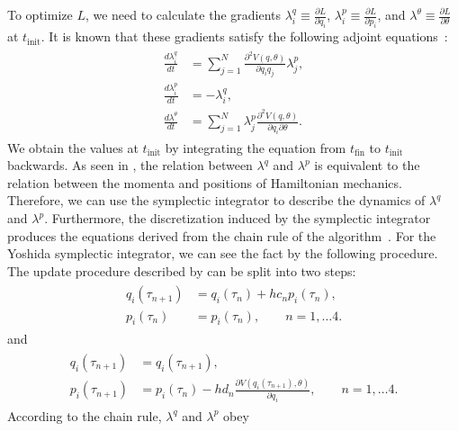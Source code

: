 To optimize $L$, we need to calculate the gradients $\lambda_i^q \equiv \frac{\partial L}{\partial q_i}$, $\lambda_i^p \equiv \frac{\partial L}{\partial p_i}$, and $\lambda^\theta \equiv \frac{\partial L}{\partial \theta}$ at $t_{\mathrm{init}}$.
It is known that these gradients satisfy the following adjoint equations~\cite{NeuralODE,Sanz-Serna2016}:
\begin{align}
  \begin{split}
    \frac{d\lambda^{q}_i}{dt} & = \sum_{j=1}^{N}\frac{\partial^2 V(q,\theta)}{\partial q_i q_j} \lambda^{p}_j, \\
    \frac{d\lambda^{p}_i}{dt} & = - \lambda^{q}_i,\\
    \frac{d\lambda^{\theta}}{dt} & =  \sum_{j=1}^{N}\lambda^{p}_j\frac{\partial^2V(q,\theta)}{\partial q_i \partial \theta}.
  \end{split} \label{eq:hamilton_dynamics_of_adjoint}
\end{align}
We obtain the values at $t_{\mathrm{init}}$ by integrating the equation from $t_{\mathrm{fin}}$ to $t_{\mathrm{init}}$ backwards.
As seen in , the relation between $\lambda^q$ and $\lambda^p$ is equivalent to the relation between the momenta and positions of Hamiltonian mechanics.
Therefore, we can use the symplectic integrator to describe the dynamics of $\lambda^q$ and $\lambda^p$.
Furthermore, the discretization induced by the symplectic integrator produces the equations derived from the chain rule of the algorithm~\cite{Sanz-Serna2016}.
For the Yoshida symplectic integrator, we can see the fact by the following procedure.
The update procedure described by  can be split into two steps:
\begin{align}
  \begin{split}
    q_i(\tau_{n+1}) &  = q_i(\tau_{n}) + h c_n p_i(\tau_{n}), \\
    p_i(\tau_{n}) & = p_i(\tau_{n}), \qquad n = 1, \ldots 4.
  \end{split}
\end{align}
and
\begin{align}
  \begin{split}
    q_i(\tau_{n+1}) & = q_i(\tau_{n+1}), \\
    p_i(\tau_{n+1}) & = p_i(\tau_{n}) - h d_n \frac{\partial V(q_i(\tau_{n+1}),\theta)}{\partial q_i},\qquad n = 1, \ldots 4.
  \end{split}
\end{align}
According to the chain rule, $\lambda^q$ and $\lambda^p$ obey
